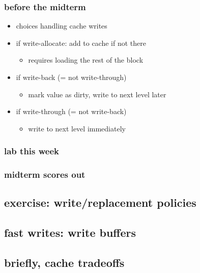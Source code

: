 \date{}
\title{}
\date{}

\begin{frame}
    \titlepage
\end{frame}



\begin{frame}
\frametitle{before the midterm}
\begin{itemize}
\item choices handling cache writes
\item if write-allocate: add to cache if not there
    \begin{itemize}
    \item requires loading the rest of the block
    \end{itemize}
\item if write-back (= not write-through)
    \begin{itemize}
    \item mark value as dirty, write to next level later
    \end{itemize}
\item if write-through (= not write-back)
    \begin{itemize}
    \item write to next level immediately
    \end{itemize}
\end{itemize}
\end{frame}

\begin{frame}
\frametitle{lab this week}
\end{frame}

\begin{frame}
\frametitle{midterm scores out}
\end{frame}

\subsection{exercise: write/replacement policies}


\subsection{fast writes: write buffers}


\subsection{briefly, cache tradeoffs}



